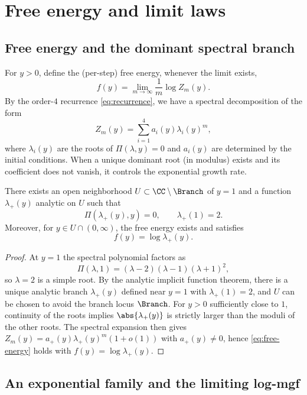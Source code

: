 \section{Free energy and limit laws}\label{sec:free}

\subsection{Free energy and the dominant spectral branch}

For \(y>0\), define the (per-step) free energy, whenever the limit exists,
\begin{equation}\label{eq:free-energy}
f(y)=\lim_{m\to\infty}\frac{1}{m}\log Z_m(y).
\end{equation}
By the order-\(4\) recurrence \eqref{eq:recurrence}, we have a spectral decomposition of the form
\[
Z_m(y)=\sum_{i=1}^4 a_i(y)\lambda_i(y)^m,
\]
where \(\lambda_i(y)\) are the roots of \(\Pi(\lambda,y)=0\) and \(a_i(y)\) are determined by the initial conditions.
When a unique dominant root (in modulus) exists and its coefficient does not vanish, it controls the exponential growth rate.

\begin{theorem}\label{thm:lambda-plus}
There exists an open neighborhood \(U\subset\CC\setminus\Branch\) of \(y=1\) and a function \(\lambda_+(y)\) analytic on \(U\) such that
\[
\Pi(\lambda_+(y),y)=0,\qquad \lambda_+(1)=2.
\]
Moreover, for \(y\in U\cap(0,\infty)\), the free energy exists and satisfies
\[
f(y)=\log \lambda_+(y).
\]
\end{theorem}

\begin{proof}
At \(y=1\) the spectral polynomial factors as
\[
\Pi(\lambda,1)=(\lambda-2)(\lambda-1)(\lambda+1)^2,
\]
so \(\lambda=2\) is a simple root.
By the analytic implicit function theorem, there is a unique analytic branch \(\lambda_+(y)\) defined near \(y=1\) with \(\lambda_+(1)=2\), and \(U\) can be chosen to avoid the branch locus \(\Branch\).
For \(y>0\) sufficiently close to \(1\), continuity of the roots implies \(\abs{\lambda_+(y)}\) is strictly larger than the moduli of the other roots.
The spectral expansion then gives \(Z_m(y)=a_+(y)\lambda_+(y)^m(1+o(1))\) with \(a_+(y)\neq 0\), hence \eqref{eq:free-energy} holds with \(f(y)=\log\lambda_+(y)\).
\end{proof}

\subsection{An exponential family and the limiting log-mgf}

